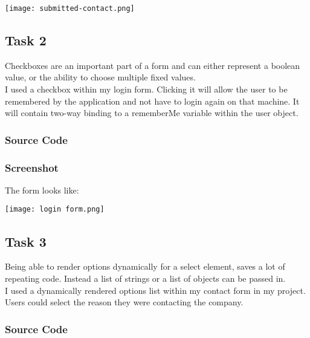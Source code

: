 \documentclass[portfolio.tex]{subfiles}
\begin{document}
				\begin{center}
					\texttt{[image: submitted-contact.png]}
				\end{center}

		\subsection{Task 2}
			Checkboxes are an important part of a form and can either represent a boolean value, or the ability to choose multiple fixed values.\\

			I used a checkbox within my login form. Clicking it will allow the user to be remembered by the application and not have to login again on that machine. It will contain two-way binding to a rememberMe variable within the user object.

			\subsubsection{Source Code}
			\subsubsection{Screenshot}
				The form looks like:

				\begin{center}
					\texttt{[image: login form.png]}
				\end{center}

		\subsection{Task 3}
			Being able to render options dynamically for a select element, saves a lot of repeating code. Instead a list of strings or a list of objects can be passed in.\\

			I used a dynamically rendered options list within my contact form in my project. Users could select the reason they were contacting the company.
			\subsubsection{Source Code}
\end{document}
